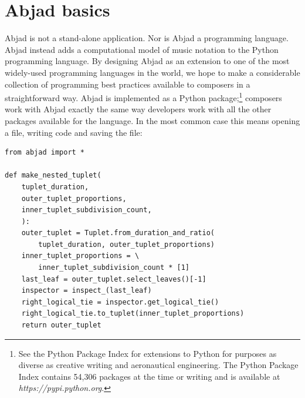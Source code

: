 \documentclass{article}
\begin{document}
\section{Abjad basics} \label{sec:example}

Abjad is not a stand-alone application. Nor is Abjad a programming language.
Abjad instead adds a computational model of music notation to the Python programming language.
By designing Abjad as an extension to one of the most widely-used programming languages in the world, we hope to make a considerable collection of programming best practices available to composers in a straightforward way. Abjad is implemented as a Python package;\footnote{See the Python Package Index for extensions to Python for purposes as diverse as creative writing and aeronautical engineering. The Python Package Index contains 54,306 packages at the time or writing and is available at \textit{https://pypi.python.org}.} composers work with Abjad exactly the same way developers work with all the other packages available for the language. In the most common case this means opening a file, writing code and saving the file:

\begin{lstlisting}
from abjad import *

def make_nested_tuplet(
    tuplet_duration,
    outer_tuplet_proportions,
    inner_tuplet_subdivision_count,
    ):
    outer_tuplet = Tuplet.from_duration_and_ratio(
        tuplet_duration, outer_tuplet_proportions)
    inner_tuplet_proportions = \
        inner_tuplet_subdivision_count * [1]
    last_leaf = outer_tuplet.select_leaves()[-1]
    inspector = inspect_(last_leaf)
    right_logical_tie = inspector.get_logical_tie()
    right_logical_tie.to_tuplet(inner_tuplet_proportions)
    return outer_tuplet
\end{lstlisting}
\end{document}
